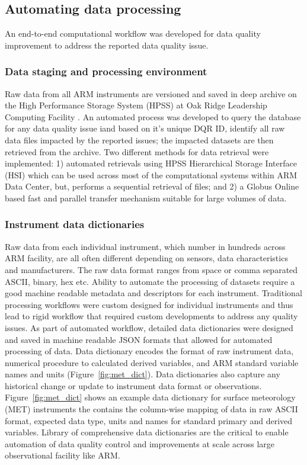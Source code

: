 \subsection{Automating data processing}
An end-to-end computational workflow was developed for data quality
improvement to address the reported data quality issue.

\subsubsection{Data staging and processing environment}
Raw data from all ARM instruments are versioned and saved in deep
archive on the High Performance Storage System (HPSS) \cite{Watson_HSI_2005}
at Oak Ridge Leadership Computing Facility \cite{olcf_hpss}. An
automated process was developed to query the database for any data
quality issue iand based on it's unique DQR ID, identify all raw data files
impacted by the reported issues; the impacted datasets are then
retrieved from the archive. Two different
methods for data retrieval were implemented: 1) automated retrievals
using HPSS Hierarchical Storage Interface (HSI) \cite{Watson_HSI_2005}
which can be used across
most of the computational systems within ARM Data Center, but,
performs a sequential retrieval of files; and 2) a Globus Online
\cite{Foster_Globus_2011,Allen_SSD_2012} based
fast and parallel transfer mechanism suitable for large volumes of data.  

\subsubsection{Instrument data dictionaries}
Raw data from each individual instrument, which number in hundreds across
ARM facility, are all often different depending on sensors, data
characteristics and manufacturers. The raw data format ranges from space or comma
separated ASCII, binary, hex etc. Ability to automate the processing of
datasets require a good machine readable metadata and descriptors for
each instrument. Traditional processing workflows were custom
designed for individual instruments and thus lead to rigid workflow that
required custom developments to address any quality issues. As part of
automated workflow, detailed data dictionaries were designed and saved
in machine readable JSON formats that allowed for automated processing
of data. Data dictionary encodes the format of raw instrument data,
numerical procedure to calculated derived variables, and ARM standard
variable names and units (Figure~\ref{fig:met_dict}). Data dictionaries
also capture any historical change or update to instrument data format
or observations. Figure~\ref{fig:met_dict} shows an example data
dictionary for surface meteorology (MET) instruments the contains the
column-wise mapping of data in raw ASCII format, expected data type,
units and names for standard primary and derived variables.
Library of comprehensive data dictionaries are the
critical to enable automation of data quality control and improvements
at scale across large observational facility like ARM. 

